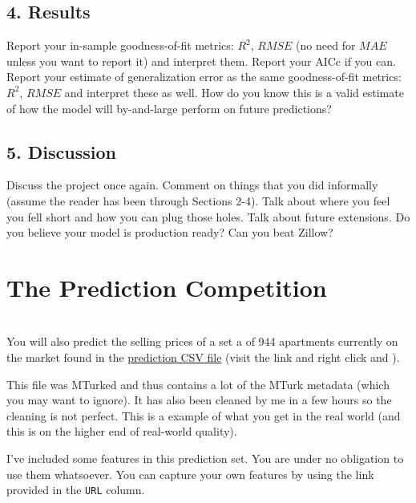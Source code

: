 \documentclass[12pt]{article}
\begin{document}
\begin{tcolorbox}
\subsection*{4. Results}

Report your in-sample goodness-of-fit metrics: $R^2$, $RMSE$ (no need for $MAE$ unless you want to report it) and interpret them. Report your AICc if you can. Report your estimate of generalization error as the same goodness-of-fit metrics: $R^2$, $RMSE$ and interpret these as well. How do you know this is a valid estimate of how the model will by-and-large perform on future predictions?

\subsection*{5. Discussion}

Discuss the project once again. Comment on things that you did informally (assume the reader has been through Sections 2-4). Talk about where you feel you fell short and how you can plug those holes. Talk about future extensions. Do you believe your model is production ready? Can you beat Zillow?

\end{tcolorbox}

\section{The Prediction Competition}

 \\ 

You will also predict the selling prices of a set a of 944 apartments currently on the market found in the \href{https://raw.githubusercontent.com/kapelner/Wharton_Stat_422_722/master/assignments/project/stat_422_722_project_prediction_set.csv}{prediction CSV file} (visit the link and right click and ). 

This file was MTurked and thus contains a lot of the MTurk metadata (which you may want to ignore). It has also been cleaned by me in a few hours so the cleaning is not perfect. This is a example of what you get in the real world (and this is on the higher end of real-world quality).

I've included some features in this prediction set. You are under no obligation to use them whatsoever. You can capture your own features by using the link provided in the \texttt{URL} column.
\end{document}
